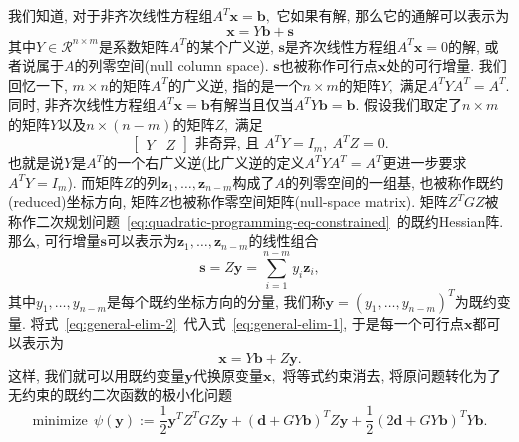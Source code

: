 \documentclass{SBCbookchapter}
\newcommand{\V}[1]{{\bm{#1}}}
\newcommand{\R}{\mathcal{R}}
\numberwithin{equation}{section}
\begin{document}
我们知道, 对于非齐次线性方程组$A^T \V{x} = \V{b},$ 它如果有解, 那么它的通解可以表示为
\begin{equation}
\label{eq:general-elim-1}
\V{x} = Y \V{b} + \V{s}
\end{equation}
其中$Y \in \R^{n\times m}$是系数矩阵$A^T$的某个广义逆, $\V{s}$是齐次线性方程组$A^T \V{x} = 0$的解, 或者说属于$A$的列零空间(null column space). $\V{s}$也被称作可行点$\V{x}$处的可行增量. 我们回忆一下, $m\times n$的矩阵$A^T$的广义逆, 指的是一个$n\times m$的矩阵$Y,$ 满足$A^T Y A^T = A^T.$ 同时, 非齐次线性方程组$A^T \V{x} = \V{b}$有解当且仅当$A^T Y \V{b} = \V{b}.$ 假设我们取定了$n \times m$的矩阵$Y$以及$n \times (n-m)$的矩阵$Z,$ 满足
\begin{equation}
\label{eq:eq:general-elim-req}
\begin{bmatrix} Y & Z\end{bmatrix} \text{ 非奇异, 且~} A^T Y = I_m, ~ A^T Z = 0.
\end{equation}
也就是说$Y$是$A^T$的一个右广义逆(比广义逆的定义$A^T Y A^T = A^T$更进一步要求$A^T Y = I_m$). 而矩阵$Z$的列$\V{z}_1, \ldots, \V{z}_{n-m}$构成了$A$的列零空间的一组基, 也被称作既约(reduced)坐标方向, 矩阵$Z$也被称作零空间矩阵(null-space matrix). 矩阵$Z^T G Z$被称作二次规划问题~\eqref{eq:quadratic-programming-eq-constrained}~的既约Hessian阵. 那么, 可行增量$\V{s}$可以表示为$\V{z}_1, \ldots, \V{z}_{n-m}$的线性组合
\begin{equation}
\label{eq:general-elim-2}
\V{s} = Z \V{y} = \sum\limits_{i=1}^{n-m} y_i \V{z}_i,
\end{equation}
其中$y_1, \ldots, y_{n-m}$是每个既约坐标方向的分量, 我们称$\V{y} = (y_1, \ldots, y_{n-m})^T$为既约变量. 将式~\eqref{eq:general-elim-2}~代入式~\eqref{eq:general-elim-1}, 于是每一个可行点$\V{x}$都可以表示为
\begin{equation}
\label{eq:general-elim-3}
\V{x} = Y \V{b} + Z \V{y}.
\end{equation}
这样, 我们就可以用既约变量$\V{y}$代换原变量$\V{x},$ 将等式约束消去, 将原问题转化为了无约束的既约二次函数的极小化问题
\begin{equation}
\label{eq:general-elim-4}
\text{minimize} ~~ \psi(\V{y}) := \frac{1}{2} \V{y}^T Z^T G Z \V{y} + \left( \V{d} + G Y \V{b} \right)^T Z \V{y} + \frac{1}{2} \left( 2\V{d} + G Y \V{b} \right)^T Y \V{b}.
\end{equation}
\end{document}
